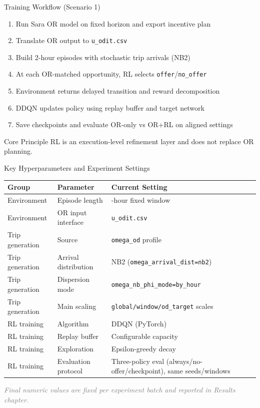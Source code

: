 ﻿\documentclass[aspectratio=169]{beamer}
\newcommand{\tightlist}{\setlength{\itemsep}{4pt}\setlength{\parskip}{0pt}}
\newcommand{\ph}[1]{\textcolor{gray}{\textit{#1}}}
\begin{document}
\begin{frame}{Training Workflow (Scenario 1)}
\begin{enumerate}\tightlist
  \item Run Sara OR model on fixed horizon and export incentive plan
  \item Translate OR output to \texttt{u\_odit.csv}
  \item Build 2-hour episodes with stochastic trip arrivals (NB2)
  \item At each OR-matched opportunity, RL selects \texttt{offer}/\texttt{no\_offer}
  \item Environment returns delayed transition and reward decomposition
  \item DDQN updates policy using replay buffer and target network
  \item Save checkpoints and evaluate OR-only vs OR+RL on aligned settings
\end{enumerate}

\vspace{0.4em}
\begin{exampleblock}{Core Principle}
RL is an execution-level refinement layer and does not replace OR planning.
\end{exampleblock}
\end{frame}

\begin{frame}{Key Hyperparameters and Experiment Settings}
\small
\begin{table}
\centering
\begin{tabular}{>{\raggedright\arraybackslash}p{} >{\raggedright\arraybackslash}p{} >{\raggedright\arraybackslash}p{}}
\toprule
Group & Parameter & Current Setting \\
\midrule
Environment & Episode length & 2-hour fixed window \\
Environment & OR input interface & \texttt{u\_odit.csv} \\
Trip generation & Source & \texttt{omega\_od} profile \\
Trip generation & Arrival distribution & NB2 (\texttt{omega\_arrival\_dist=nb2}) \\
Trip generation & Dispersion mode & \texttt{omega\_nb\_phi\_mode=by\_hour} \\
Trip generation & Main scaling & \texttt{global/window/od\_target} scales \\
RL training & Algorithm & DDQN (PyTorch) \\
RL training & Replay buffer & Configurable capacity \\
RL training & Exploration & Epsilon-greedy decay \\
RL training & Evaluation protocol & Three-policy eval (always/no-offer/checkpoint), same seeds/windows \\
\bottomrule
\end{tabular}
\end{table}

\vspace{0.2em}
\ph{Final numeric values are fixed per experiment batch and reported in Results chapter.}
\end{frame}
\end{document}

